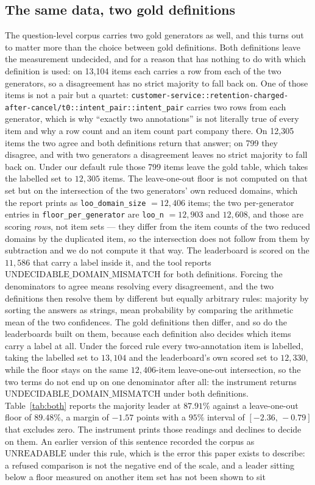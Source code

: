 \documentclass{article}
\begin{document}
\subsection{The same data, two gold definitions}
\label{sec:both} The question-level corpus carries two gold generators as well, and this turns out to matter more than the choice between gold definitions. Both definitions leave the measurement undecided, and for a reason that has nothing to do with which definition is used: on 13,104 items each carries a row from each of the two generators, so a disagreement has no strict majority to fall back on. One of those items is not a pair but a quartet: \texttt{customer-service::retention-charged-after-}\allowbreak\texttt{cancel/t0::intent\_pair::}\allowbreak\texttt{intent\_pair} carries two rows from each generator, which is why ``exactly two annotations'' is not literally true of every item and why a row count and an item count part company there. On 12,305 items the two agree and both definitions return that answer; on 799 they disagree, and with two generators a disagreement leaves no strict majority to fall back on. Under our default rule those 799 items leave the gold table, which takes the labelled set to $12,305$ items. The leave-one-out floor is not computed on that set but on the intersection of the two generators' own reduced domains, which the report prints as \texttt{loo\_domain\_size} $=12,406$ items; the two per-generator entries in \texttt{floor\_per\_generator} are \texttt{loo\_n} $=12,903$ and $12,608$, and those are scoring \emph{rows}, not item sets --- they differ from the item counts of the two reduced domains by the duplicated item, so the intersection does not follow from them by subtraction and we do not compute it that way. The leaderboard is scored on the $11,586$ that carry a label inside it, and the tool reports $\mathrm{UNDECIDABLE\_DOMAIN\_MISMATCH}$ for both definitions. Forcing the denominators to agree means resolving every disagreement, and the two definitions then resolve them by different but equally arbitrary rules: majority by sorting the answers as strings, mean probability by comparing the arithmetic mean of the two confidences. The gold definitions then differ, and so do the leaderboards built on them, because each definition also decides which items carry a label at all. Under the forced rule every two-annotation item is labelled, taking the labelled set to $13,104$ and the leaderboard's own scored set to $12,330$, while the floor stays on the same $12,406$-item leave-one-out intersection, so the two terms do not end up on one denominator after all: the instrument returns $\mathrm{UNDECIDABLE\_DOMAIN\_MISMATCH}$ under both definitions. Table~\ref{tab:both} reports the majority leader at $87.91\%$ against a leave-one-out floor of $89.48\%$, a margin of $-1.57$ points with a $95\%$ interval of $[-2.36,\,-0.79]$ that excludes zero. The instrument prints those readings and declines to decide on them. An earlier version of this sentence recorded the corpus as $\mathrm{UNREADABLE}$ under this rule, which is the error this paper exists to describe: a refused comparison is not the negative end of the scale, and a leader sitting below a floor measured on another item set has not been shown to sit 
\end{document}
